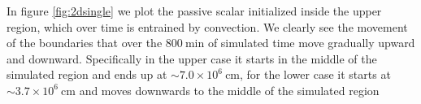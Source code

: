 \begin{figure}[t!]
  \centering
  \centering
  \hfill
  \caption{}
  \end{figure}
  In figure \ref{fig:2dsingle} we plot the passive scalar initialized inside the upper region, which over time is entrained by convection. We clearly see the movement of the boundaries that over the $800 \ \mathrm{min}$ of simulated time move gradually upward and downward. Specifically in the upper case it starts in the middle of the simulated region and ends up at $\sim 7.0 \times 10^{6} \ \mathrm{cm}$, for the lower case it starts at $\sim 3.7 \times 10^{6} \ \mathrm{cm}$ and moves downwards to the middle of the simulated region 


